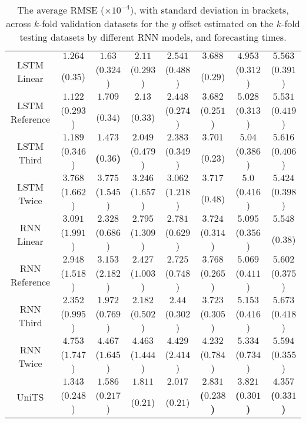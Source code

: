 \begin{table}[!ht]
{\begin{tabular}{|c|c|c|c|c|c|c|c|}
			\multirow{2}{*}{LSTM Linear} & $1.264$ & $1.63$ & $2.11$ & $2.541$ & $3.688$ & $4.953$ & $5.563$ \\
			 & ($0.35$) & ($0.324$) & ($0.293$) & ($0.488$) & ($0.29$) & ($0.312$) & ($0.391$) \\ \hline
			\multirow{2}{*}{LSTM Reference} & $1.122$ & $1.709$ & $2.13$ & $2.448$ & $3.682$ & $5.028$ & $5.531$ \\
			 & ($0.293$) & ($0.34$) & ($0.33$) & ($0.274$) & ($0.251$) & ($0.313$) & ($0.419$) \\ \hline
			\multirow{2}{*}{LSTM Third} & $1.189$ & $\mathbf{1.473}$ & $2.049$ & $2.383$ & $3.701$ & $5.04$ & $5.616$ \\
			 & ($0.346$) & \textbf{(}$\mathbf{0.36}$\textbf{)} & ($0.479$) & ($0.349$) & ($0.23$) & ($0.386$) & ($0.406$) \\ \hline
			\multirow{2}{*}{LSTM Twice} & $3.768$ & $3.775$ & $3.246$ & $3.062$ & $3.717$ & $5.0$ & $5.424$ \\
			 & ($1.662$) & ($1.545$) & ($1.657$) & ($1.218$) & ($0.48$) & ($0.416$) & ($0.398$) \\ \hline
			\multirow{2}{*}{RNN Linear} & $3.091$ & $2.328$ & $2.795$ & $2.781$ & $3.724$ & $5.095$ & $5.548$ \\
			 & ($1.991$) & ($0.686$) & ($1.309$) & ($0.629$) & ($0.314$) & ($0.356$) & ($0.38$) \\ \hline
			\multirow{2}{*}{RNN Reference} & $2.948$ & $3.153$ & $2.427$ & $2.725$ & $3.768$ & $5.069$ & $5.602$ \\
			 & ($1.518$) & ($2.182$) & ($1.003$) & ($0.748$) & ($0.265$) & ($0.411$) & ($0.375$) \\ \hline
			\multirow{2}{*}{RNN Third} & $2.352$ & $1.972$ & $2.182$ & $2.44$ & $3.723$ & $5.153$ & $5.673$ \\
			 & ($0.995$) & ($0.769$) & ($0.502$) & ($0.302$) & ($0.305$) & ($0.416$) & ($0.418$) \\ \hline
			\multirow{2}{*}{RNN Twice} & $4.753$ & $4.467$ & $4.463$ & $4.429$ & $4.232$ & $5.334$ & $5.594$ \\
			 & ($1.747$) & ($1.645$) & ($1.444$) & ($2.414$) & ($0.784$) & ($0.734$) & ($0.355$) \\ \hline
			\multirow{2}{*}{UniTS} & $1.343$ & $1.586$ & $1.811$ & $2.017$ & $\mathbf{2.831}$ & $\mathbf{3.821}$ & $\mathbf{4.357}$ \\
			 & ($0.248$) & ($0.217$) & ($0.21$) & ($0.21$) & \textbf{(}$\mathbf{0.238}$\textbf{)} & \textbf{(}$\mathbf{0.301}$\textbf{)} & \textbf{(}$\mathbf{0.331}$\textbf{)} \\ \hline
		\end{tabular}
	}
	\caption{The average RMSE ($\times 10^{-4}$), with standard deviation in brackets, across $k$-fold validation datasets for the $y$ offset estimated on the $k$-fold testing datasets by different RNN models, and forecasting times.}
	\label{tab:all_latitude_no_abs_RMSE}
\end{table}